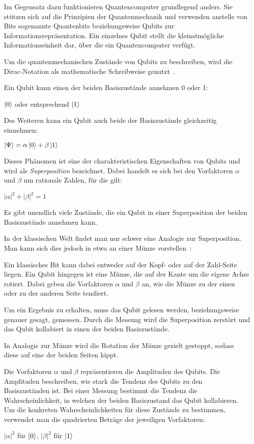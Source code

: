 Im Gegensatz dazu funktionieren Quantencomputer grundlegend anders. 
Sie stützen sich auf die Prinzipien der Quantenmechanik und 
verwenden anstelle von Bits sogenannte Quantenbits beziehungsweise Qubits zur Informationsrepräsentation. 
Ein einzelnes Qubit stellt die kleinstmögliche Informationseinheit dar, 
über die ein Quantencomputer verfügt.

Um die quantenmechanischen Zustände von Qubits zu beschreiben, 
wird die Dirac-Notation als mathematische Schreibweise genutzt~\cite{dirac_1939}.

Ein Qubit kann einen der beiden Basiszustände annehmen 0 oder  1:
\begin{center}
\(\ket{0}\) oder entsprechend \(\ket{1}\)
\end{center}

Des Weiteren kann ein Qubit auch beide der Basiszustände gleichzeitig einnehmen:
\begin{center}
\(\ket{\Psi} = \alpha\ket{0} + \beta\ket{1}\)
\end{center}
Dieses Phänomen ist eine der charakteristischen Eigenschaften von Qubits und wird als \emph{Superposition} bezeichnet.
Dabei handelt es sich bei den Vorfaktoren \(\alpha\) und \(\beta\) um rationale Zahlen, 
für die gilt:
\begin{center}
\(\lvert\alpha\rvert^2 + \lvert\beta\rvert^2 = 1\)
\end{center} 


Es gibt unendlich viele Zustände, die ein Qubit in einer Superposition der beiden Basiszustände annehmen kann.

In der klassischen Welt findet man nur schwer eine Analogie zur Superposition. 
Man kann sich dies jedoch in etwa an einer Münze vorstellen~\cite{Hoever2023Münze}:

Ein klassisches Bit kann dabei entweder auf der Kopf- oder auf der Zahl-Seite liegen.
Ein Qubit hingegen ist eine Münze, 
die auf der Kante um die eigene Achse rotiert.
Dabei geben die Vorfaktoren \(\alpha\) und \(\beta\) an, 
wie die Münze zu der einen oder zu der anderen Seite tendiert.

Um ein Ergebnis zu erhalten, 
muss das Qubit gelesen werden, 
beziehungsweise genauer gesagt, gemessen.
Durch die Messung wird die Superposition zerstört und 
das Qubit kollabiert in einen der beiden Basiszustände.

In Analogie zur Münze wird die Rotation der Münze gezielt gestoppt, sodass diese auf eine der beiden Seiten kippt. 

Die Vorfaktoren \(\alpha\) und \(\beta\) repräsentieren die Amplituden des Qubits.
Die Amplituden beschreiben, 
wie stark die Tendenz des Qubits zu den Basiszuständen ist.
Bei einer Messung bestimmt die Tendenz die Wahrscheinlichkeit, 
in welchen der beiden Basiszustand das Qubit kollabieren.
Um die konkreten Wahrscheinlichkeiten für diese Zustände zu bestimmen, 
verwendet man die quadrierten Beträge der jeweiligen Vorfaktoren:
\begin{center}
\(\lvert\alpha\rvert^2\) für \(\ket{0}\), \(\lvert\beta\rvert^2\) für \(\ket{1}\)
\end{center}

